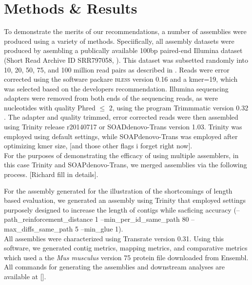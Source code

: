 \section*{Methods & Results}

To demonstrate the merits of our recommendations, a number of assemblies were produced using a variety of methods. Speciifically, all assembly datasets were produced by asembling a publically available 100bp paired-end Illumina dataset (Short Read Archive ID SRR797058, \citep{Macfarlan:2012js}). This dataset was subsetted randomly into 10, 20, 50, 75, and 100 million read pairs as described in \citep{MacManes:2014io}. Reads were error corrected using the software packare \textsc{bless} version 0.16 \citep{Heo:2014cb} and a kmer=19, which was selected based on the developers recommendation.  Illumina sequencing adapters were removed from both ends of the sequencing reads, as were nucleotides with quality Phred $\leq$ 2, using the program Trimmmatic version 0.32 \citep{Bolger:2014ek}. The adapter and quality trimmed, error corrected reads were then assembled using Trinity release r20140717 or SOADdenovo-Trans version 1.03. Trinity was employed using default settings, while SOAPdenovo-Trans was employed after optimizing kmer size, [and those other flags i forget right now]. \\

For the purposes of demonstrating the efficacy of using multiple assemblers, in this case Trinity and SOAPdenovo-Trans, we merged assemblies via the following process. [Richard fill in details].

For the assembly generated for the illustration of the shortcomings of length based evaluation, we generated an assembly using Trinity that employed settings purposely designed to increase the length of contigs while sacficing accuracy (--path\_reinforcement\_distance 1 --min\_per\_id\_same\_path 80  --max\_diffs\_same\_path 5 --min\_glue 1). \\

All assemblies were characterized using Transrate version 0.31. Using this software, we generated contig metrics, mapping metrics, and comparative metrics which used a the \textit{Mus musculus} version 75 protein file downloaded from Ensembl. All commands for generating the assemblies and downstream analyses are available at [].  